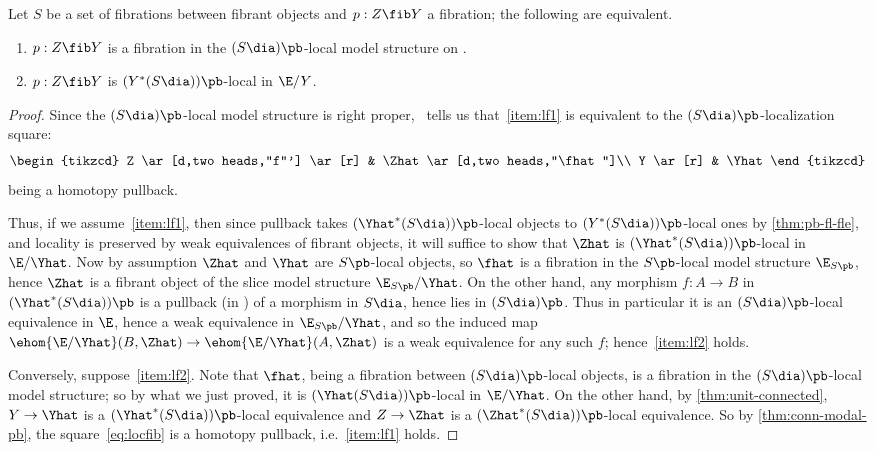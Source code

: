 \begin{prop}\label{thm:locfib}
  Let $S$ be a set of fibrations between fibrant objects and $p:Z\fib Y$ a fibration; the following are equivalent.
  \begin{enumerate}
  \item $p:Z\fib Y$ is a fibration in the $(S\dia)\pb$-local model structure on \E.\label{item:lf1}
  \item $p:Z\fib Y$ is $(Y^*(S\dia))\pb$-local in $\E/Y$.\label{item:lf2}
  \end{enumerate}
\end{prop}
\begin{proof}
  Since the $(S\dia)\pb$-local model structure is right proper,~\cite[Proposition 3.4.8]{hirschhorn:modelcats} tells us that~\ref{item:lf1} is equivalent to the $(S\dia)\pb$-localization square:
  \begin{equation}
    \begin{tikzcd}
      Z \ar[d,two heads,"f"'] \ar[r] & \Zhat \ar[d,two heads,"\fhat"]\\
      Y \ar[r] & \Yhat
    \end{tikzcd}\label{eq:locfib}
  \end{equation}
  being a homotopy pullback.

  Thus, if we assume~\ref{item:lf1}, then since pullback takes $(\Yhat^*(S\dia))\pb$-local objects to $(Y^*(S\dia))\pb$-local ones by \cref{thm:pb-fl-fle}, and locality is preserved by weak equivalences of fibrant objects, it will suffice to show that $\Zhat$ is $(\Yhat^*(S\dia))\pb$-local in $\E/\Yhat$.
  Now by assumption $\Zhat$ and $\Yhat$ are $S\pb$-local objects, so $\fhat$ is a fibration in the $S\pb$-local model structure $\E_{S\pb}$, hence $\Zhat$ is a fibrant object of the slice model structure $\E_{S\pb}/\Yhat$.
  On the other hand, any morphism $f:A\to B$ in $(\Yhat^*(S\dia))\pb$ is a pullback (in \E) of a morphism in $S\dia$, hence lies in $(S\dia)\pb$.
  Thus in particular it is an $(S\dia)\pb$-local equivalence in $\E$, hence a weak equivalence in $\E_{S\pb}/\Yhat$, and so the induced map
  \( \ehom{\E/\Yhat}(B,\Zhat) \to \ehom{\E/\Yhat}(A,\Zhat) \)
  is a weak equivalence for any such $f$; hence~\ref{item:lf2} holds.

  Conversely, suppose~\ref{item:lf2}.
  Note that $\fhat$, being a fibration between $(S\dia)\pb$-local objects, is a fibration in the $(S\dia)\pb$-local model structure; so by what we just proved, it is $(\Yhat(S\dia))\pb$-local in $\E/\Yhat$.
  On the other hand, by \cref{thm:unit-connected}, $Y\to \Yhat$ is a $(\Yhat^*(S\dia))\pb$-local equivalence and $Z\to \Zhat$ is a $(\Zhat^*(S\dia))\pb$-local equivalence.
  So by \cref{thm:conn-modal-pb}, the square~\eqref{eq:locfib} is a homotopy pullback, i.e.~\ref{item:lf1} holds.
\end{proof}

